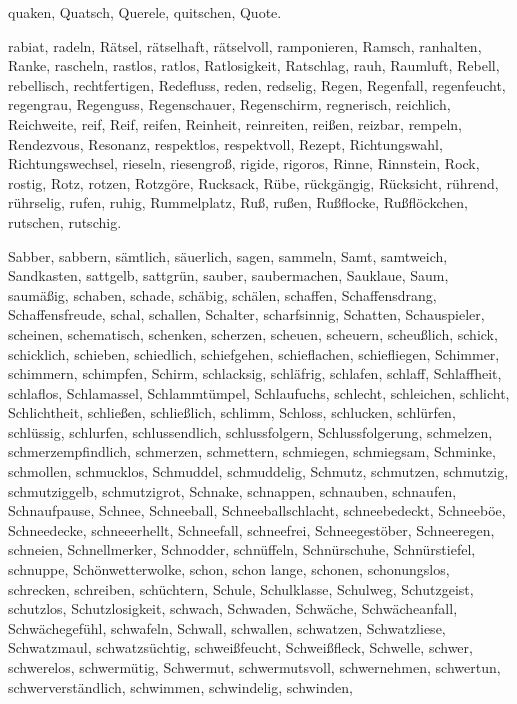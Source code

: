 \documentclass[a4paper,10pt,fleqn,twocolumn,twoside,dvipdfmx]{scrartcl}
\begin{document}
quaken,
Quatsch,
Querele,
quitschen,
Quote.

rabiat,
radeln,
Rätsel,
rätselhaft,
rätselvoll,
ramponieren,
Ramsch,
ranhalten,
Ranke,
rascheln,
rastlos,
ratlos,
Ratlosigkeit,
Ratschlag,
rauh,
Raumluft,
Rebell,
rebellisch,
rechtfertigen,
Redefluss,
reden,
redselig,
Regen,
Regenfall,
regenfeucht,
regengrau,
Regenguss,
Regenschauer,
Regenschirm,
regnerisch,
reichlich,
Reichweite,
reif,
Reif,
reifen,
Reinheit,
reinreiten,
reißen,
reizbar,
rempeln,
Rendezvous,
Resonanz,
respektlos,
respektvoll,
Rezept,
Richtungswahl,
Richtungswechsel,
rieseln,
riesengroß,
rigide,
rigoros,
Rinne,
Rinnstein,
Rock,
rostig,
Rotz,
rotzen,
Rotzgöre,
Rucksack,
Rübe,
rückgängig,
Rücksicht,
rührend,
rührselig,
rufen,
ruhig,
Rummelplatz,
Ruß,
rußen,
Rußflocke,
Rußflöckchen,
rutschen,
rutschig.

Sabber,
sabbern,
sämtlich,
säuerlich,
sagen,
sammeln,
Samt,
samtweich,
Sandkasten,
sattgelb,
sattgrün,
sauber,
saubermachen,
Sauklaue,
Saum,
saumäßig,
schaben,
schade,
schäbig,
schälen,
schaffen,
Schaffensdrang,
Schaffensfreude,
schal,
schallen,
Schalter,
scharfsinnig,
Schatten,
Schauspieler,
scheinen,
schematisch,
schenken,
scherzen,
scheuen,
scheuern,
scheußlich,
schick,
schicklich,
schieben,
schiedlich,
schiefgehen,
schieflachen,
schiefliegen,
Schimmer,
schimmern,
schimpfen,
Schirm,
schlacksig,
schläfrig,
schlafen,
schlaff,
Schlaffheit,
schlaflos,
Schlamassel,
Schlammtümpel,
Schlaufuchs,
schlecht,
schleichen,
schlicht,
Schlichtheit,
schließen,
schließlich,
schlimm,
Schloss,
schlucken,
schlürfen,
schlüssig,
schlurfen,
schlussendlich,
schlussfolgern,
Schlussfolgerung,
schmelzen,
schmerzempfindlich,
schmerzen,
schmettern,
schmiegen,
schmiegsam,
Schminke,
schmollen,
schmucklos,
Schmuddel,
schmuddelig,
Schmutz,
schmutzen,
schmutzig,
schmutziggelb,
schmutzigrot,
Schnake,
schnappen,
schnauben,
schnaufen,
Schnaufpause,
Schnee,
Schneeball,
Schneeballschlacht,
schneebedeckt,
Schneeböe,
Schneedecke,
schneeerhellt,
Schneefall,
schneefrei,
Schneegestöber,
Schneeregen,
schneien,
Schnellmerker,
Schnodder,
schnüffeln,
Schnürschuhe,
Schnürstiefel,
schnuppe,
Schönwetterwolke,
schon,
schon lange,
schonen,
schonungslos,
schrecken,
schreiben,
schüchtern,
Schule,
Schulklasse,
Schulweg,
Schutzgeist,
schutzlos,
Schutzlosigkeit,
schwach,
Schwaden,
Schwäche,
Schwächeanfall,
Schwächegefühl,
schwafeln,
Schwall,
schwallen,
schwatzen,
Schwatzliese,
Schwatzmaul,
schwatzsüchtig,
schweißfeucht,
Schweißfleck,
Schwelle,
schwer,
schwerelos,
schwermütig,
Schwermut,
schwermutsvoll,
schwernehmen,
schwertun,
schwerverständlich,
schwimmen,
schwindelig,
schwinden,
\end{document}
